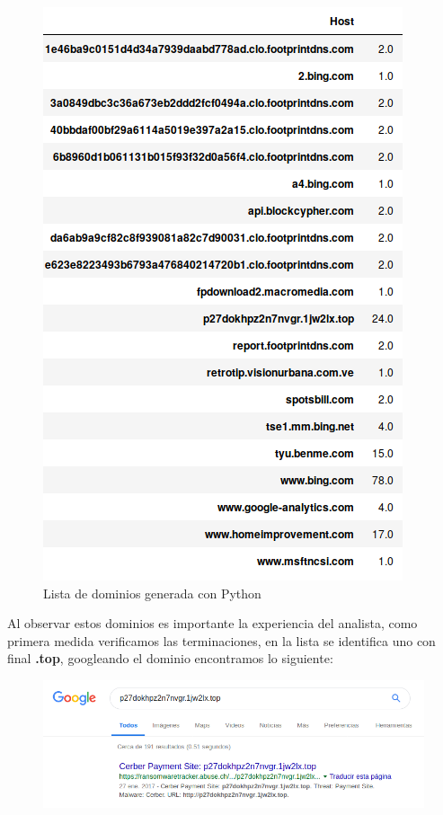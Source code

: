 \documentclass[a4paper,10pt]{article}
\begin{document}
\medskip
\begin{figure}[!htp]
\centering
\includegraphics[scale=0.5]{Wireshark/Hosts.png} 
\caption{Lista de dominios generada con Python}
\end{figure}

Al observar estos dominios es importante la experiencia del analista, como primera medida verificamos las terminaciones, en la lista se identifica uno con final \textbf{.top}, googleando el dominio encontramos lo siguiente:
\newpage

\begin{figure}[!hp]
\centering
\includegraphics[scale=0.5]{Wireshark/google.png} 
\caption{}
\end{figure}
\end{document}
